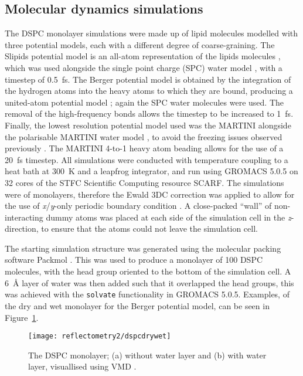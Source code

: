 \subsection{Molecular dynamics simulations}
The DSPC monolayer simulations were made up of lipid molecules modelled with three potential models, each with a different degree of coarse-graining.
The Slipids potential model is an all-atom representation of the lipids molecules \cite{jambeck_derivation_2012}, which was used alongside the single point charge (SPC) water model \cite{berendsen_missing_1987}, with a timestep of \SI{0.5}{\femto\second}.
The Berger potential model is obtained by the integration of the hydrogen atoms into the heavy atoms to which they are bound, producing a united-atom potential model \cite{berger_molecular_1997}; again the SPC water molecules were used.
The removal of the high-frequency  bonds allows the timestep to be increased to \SI{1}{\femto\second}.
Finally, the lowest resolution potential model used was the MARTINI \cite{marrink_martini_2007} alongside the polarisable MARTINI water model \cite{yesylevskyy_polarizable_2010}, to avoid the freezing issues observed previously \cite{koutsioubas_combined_2016}.
The MARTINI 4-to-1 heavy atom beading allows for the use of a \SI{20}{\femto\second} timestep.
All simulations were conducted with temperature coupling to a heat bath at \SI{300}{\kelvin} and a leapfrog integrator, and run using GROMACS 5.0.5 \cite{berendsen_gromacs_1995,lindahl_gromacs_2001,van_der_spoel_gromacs_2005,hess_gromacs_2008} on 32 cores of the STFC Scientific Computing resource SCARF.
The simulations were of monolayers, therefore the Ewald 3DC correction was applied to allow for the use of \emph{x}/\emph{y}-only periodic boundary condition \cite{yeh_ewald_1999}.
A close-packed ``wall'' of non-interacting dummy atoms was placed at each side of the simulation cell in the \emph{z}-direction, to ensure that the atoms could not leave the simulation cell.

The starting simulation structure was generated using the molecular packing software Packmol \cite{martinez_packmol_2009}.
This was used to produce a monolayer of \num{100} DSPC molecules, with the head group oriented to the bottom of the simulation cell.
A \SI{6}{\angstrom} layer of water was then added such that it overlapped the head groups, this was achieved with the \texttt{solvate} functionality in GROMACS 5.0.5.
Examples, of the dry and wet monolayer for the Berger potential model, can be seen in Figure~\ref{fig:drywet}.
%
\begin{figure}
    \centering
    \texttt{[image: reflectometry2/dspcdrywet]}
    \caption{The DSPC monolayer; (a) without water layer and (b) with water layer, visuallised using VMD \cite{humphrey_vmd_1996}.}
    \label{fig:drywet}
\end{figure}
%

